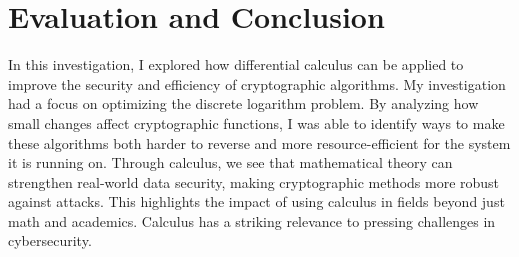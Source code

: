 \documentclass[12pt]{article}
\begin{document}
\section{Evaluation and Conclusion}
In this investigation, I explored how differential calculus can be applied to improve the security and efficiency of cryptographic algorithms.  My investigation had a focus on optimizing the discrete logarithm problem. By analyzing how small changes affect cryptographic functions, I was able to identify ways to make these algorithms both harder to reverse and more resource-efficient for the system it is running on. Through calculus, we see that mathematical theory can strengthen real-world data security, making cryptographic methods more robust against attacks. This highlights the impact of using calculus in fields beyond just math and academics. Calculus has a striking relevance to pressing challenges in cybersecurity.

\newpage
\end{document}
